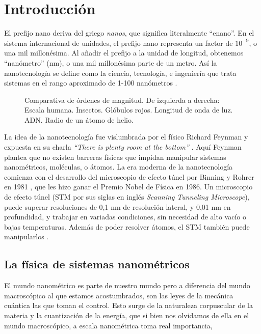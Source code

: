 \chapter*{Introducción}


El prefijo nano deriva del griego \emph{nanos}, que significa literalmente ``enano''. En el sistema internacional de unidades, el prefijo nano representa un factor de $\mathrm{10^{-9}}$, o una mil millonésima. Al añadir el prefijo a la unidad de longitud, obtenemos ``nanómetro'' (nm), o una mil millonésima parte de un metro. Así la nanotecnología se define como la ciencia, tecnología, e ingeniería que trata sistemas en el rango aproximado de 1-100 nanómetros \citep{Haick2013,Gressler2013}.

\begin{figure}[h!]
	\centering
	\label{fig:scale}
	\caption[asd]{Comparativa de órdenes de magnitud. De izquierda a derecha: Escala humana. Insectos. Glóbulos rojos. Longitud de onda de luz. ADN. Radio de un átomo de helio.}
\end{figure}

La idea de la nanotecnología fue vislumbrada por el físico Richard Feynman y expuesta en su charla \emph{``There is plenty room at the bottom''} \citep{Feynman1960}. Aquí Feynman plantea que no existen barreras físicas que impidan manipular sistemas nanométricos, moléculas, o átomos. La era moderna de la nanotecnología comienza con el desarrollo del microscopio de efecto túnel por Binning y Rohrer en 1981 \citep{Binnig1982}, que les hizo ganar el Premio Nobel de Física en 1986. Un microscopio de efecto túnel (STM por sus siglas en inglés \emph{Scanning Tunneling Microscope}), puede superar resoluciones de 0,1 nm de resolución lateral, y 0,01 nm en profundidad, y trabajar en variadas condiciones, sin necesidad de alto vacío o bajas temperaturas. Además de poder resolver átomos, el STM también puede manipularlos \citep{Chen2008}.



\section*{La física de sistemas nanométricos}
El mundo nanométrico es parte de nuestro mundo pero a diferencia del mundo macroscópico al que estamos acostumbrados, son las leyes de la mecánica cuántica las que toman el control. Esto surge de la naturaleza corpuscular de la materia y la cuantización de la energía, que si bien nos olvidamos de ella en el mundo macroscópico, a escala nanométrica toma real importancia, 
